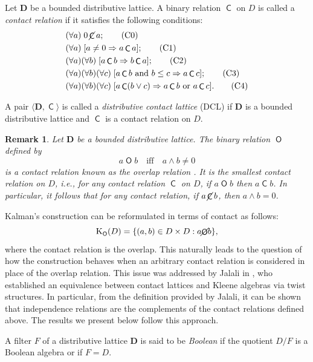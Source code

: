 \documentclass[10pt,a4paper]{amsart}
\newtheorem{remark}[theorem]{Remark}
\DeclareMathOperator{\con}{\mathsf{C}}
\DeclareMathOperator{\notcon}{\cancel{ \con}}
\DeclareMathOperator{\Overl}{\mathsf{O}}
\newcommand{\KO}[1]{\mathrm{K}_{\Overl}(#1)}
\newcommand{\D}{\mathbf{D}}
\begin{document}
Let $\D$ be a bounded distributive lattice. A binary relation $\con$ on $D$ is called a \emph{contact relation} \cite{duntsch2006topological,duntsch2008distributive} if it satisfies the following conditions:
\begin{align}
 &(\forall a)\; 0\notcon a; \label{C0}\tag{C0} \\
 &(\forall a)\; [a \neq 0 \Rightarrow a\con a]; \label{C1}\tag{C1} \\
 &(\forall a)(\forall b)\; [a\con b \Rightarrow b\con a]; \label{C2}\tag{C2} \\
 &(\forall a)(\forall b)(\forall c)\; [a\con b \text{ and } b \leq c \Rightarrow a\con c]; \label{C3}\tag{C3} \\
 &(\forall a)(\forall b)(\forall c)\; [a\con (b \vee c) \Rightarrow a\con b \text{ or } a\con c]. \label{C4}\tag{C4}
\end{align}

A pair $\langle \D, \con \rangle$ is called a \emph{distributive contact lattice} (DCL) if $\D$ is a bounded distributive lattice and $\con$ is a contact relation on $D$.

\begin{remark}\label{rem:overlap}
    Let $\D$ be a bounded distributive lattice. The binary relation $\Overl$ defined by
    \[
    a \Overl b \quad \text{iff} \quad a \wedge b \neq 0
    \]
    is a contact relation known as the \emph{overlap relation} \cite{duntsch2008distributive}. It is the smallest contact relation on $D$, i.e., for any contact relation $\con$ on $D$, if $a \Overl b$ then $a \con b$. In particular, it follows that for any contact relation, if $a \notcon b$, then $a \wedge b = 0$. 
\end{remark}

Kalman's construction can be reformulated in terms of contact as follows:
\[
\KO{D} = \{(a, b) \in D \times D : a \cancel{\Overl} b \},
\]
where the contact relation is the overlap. This naturally leads to the question of how the construction behaves when an arbitrary contact relation is considered in place of the overlap relation. This issue was addressed by Jalali in \cite{jalali}, who established an equivalence between contact lattices and Kleene algebras via twist structures. In particular, from the definition provided by Jalali, it can be shown that independence relations are the complements of the contact relations defined above. The results we present below follow this approach.

A filter $F$ of a distributive lattice $\D$ is said to be \emph{Boolean} if the quotient $D/F$ is a Boolean algebra or if $F=D$.
\end{document}
